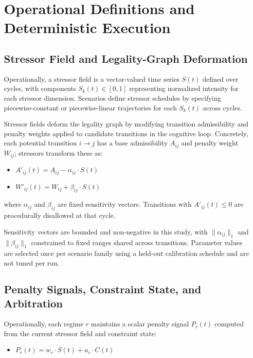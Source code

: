 \documentclass[11pt,a4paper]{article}
\begin{document}
\section{Operational Definitions and Deterministic Execution}

\subsection{Stressor Field and Legality-Graph Deformation}

Operationally, a stressor field is a vector-valued time series $S(t)$ defined over cycles, with components $S_k(t) \in [0,1]$ representing normalized intensity for each stressor dimension. Scenarios define stressor schedules by specifying piecewise-constant or piecewise-linear trajectories for each $S_k(t)$ across cycles.

Stressor fields deform the legality graph by modifying transition admissibility and penalty weights applied to candidate transitions in the cognitive loop. Concretely, each potential transition $i \to j$ has a base admissibility $A_{ij}$ and penalty weight $W_{ij}$; stressors transform these as:

\begin{itemize}
    \item $A'_{ij}(t) = A_{ij} - \alpha_{ij} \cdot S(t)$
    \item $W'_{ij}(t) = W_{ij} + \beta_{ij} \cdot S(t)$
\end{itemize}

where $\alpha_{ij}$ and $\beta_{ij}$ are fixed sensitivity vectors. Transitions with $A'_{ij}(t) \leq 0$ are procedurally disallowed at that cycle.

Sensitivity vectors are bounded and non-negative in this study, with $\|\alpha_{ij}\|_1$ and $\|\beta_{ij}\|_1$ constrained to fixed ranges shared across transitions. Parameter values are selected once per scenario family using a held-out calibration schedule and are not tuned per run.

\subsection{Penalty Signals, Constraint State, and Arbitration}

Operationally, each regime $r$ maintains a scalar penalty signal $P_r(t)$ computed from the current stressor field and constraint state:

\begin{itemize}
    \item $P_r(t) = w_r \cdot S(t) + u_r \cdot C(t)$
\end{itemize}
\end{document}
